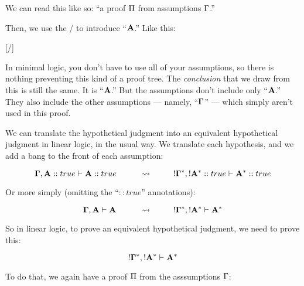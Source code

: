 \documentclass[../../../main.tex]{subfiles}
\begin{document}
\begin{prooftree*}
  \hypo{}
  \ellipsis{}{\Proof/}
  \ellipsis{}{}
\end{prooftree*}

\noindent
We can read this like so: ``a proof $\Proof/$ from assumptions $\context/$.''

Then, we use the \startrule/ to introduce ``$\mathbf{A}$.'' Like this:

\begin{prooftree*}
  \hypo{}
  \ellipsis{}{\Proof/}
  \ellipsis{}{}
  \hypo{}
  [\startrule/]{}
\end{prooftree*}

\noindent
In minimal logic, you don't have to use all of your assumptions, so there is nothing preventing this kind of a proof tree. The \emph{conclusion} that we draw from this is still the same. It is ``$\mathbf{A}$.'' But the assumptions don't include only ``$\mathbf{A}$.'' They also include the other assumptions --- namely, ``$\nd{\context/}$'' --- which simply aren't used in this proof.

We can translate the hypothetical judgment into an equivalent hypothetical judgment in linear logic, in the usual way. We translate each hypothesis, and we add a bang to the front of each assumption:

\begin{equation*}
  \nd{\context/}, \nd{A} :: true \ndturnstile/ \nd{A} :: true
  \hskip 1cm \rightsquigarrow \hskip 1cm
  \bang/\nd{\context/}^{*}, \bang/\nd{A}^{*} :: true \ndturnstile/ \nd{A}^{*} :: true
\end{equation*}

\noindent
Or more simply (omitting the ``$:: true$'' annotations):

\begin{equation*}
  \nd{\context/}, \nd{A} \ndturnstile/ \nd{A}
  \hskip 1cm \rightsquigarrow \hskip 1cm
  \bang/\nd{\context/}^{*}, \bang/\nd{A}^{*} \ndturnstile/ \nd{A}^{*}
\end{equation*}

\noindent
So in linear logic, to prove an equivalent hypothetical judgment, we need to prove this:

\begin{equation*}
  \bang/\nd{\context/}^{*}, \bang/\nd{A}^{*} \ndturnstile/ \nd{A}^{*}
\end{equation*}

\noindent
To do that, we again have a proof $\Proof/$ from the asssumptions $\context/$:
\end{document}
